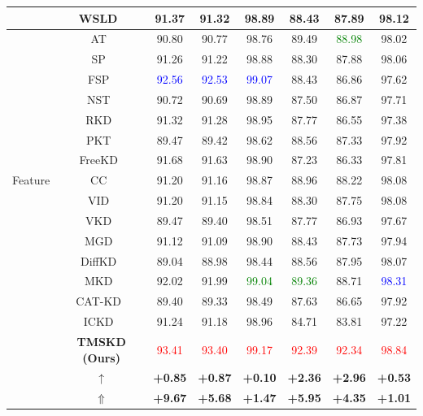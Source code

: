 ﻿\documentclass[lettersize,journal]{IEEEtran}
\begin{document}
\begin{table}[!htbp]
\begin{tabular}{c|c|c|c|c|c|c|c}
& WSLD~\cite{Zhou2021WSLD} & 91.37 & 91.32 & 98.89 & 88.43 & 87.89 & 98.12 \\
\midrule
\multirow{15}{*}{Feature}
& AT~\cite{Zagoruyko2017AT} & 90.80 & 90.77 & 98.76 & 89.49 & \textcolor{green}{88.98} & 98.02 \\
& SP~\cite{Tung2019SP} & 91.26 & 91.22 & 98.88 & 88.30 & 87.88 & 98.06 \\
& FSP~\cite{Yim2017FSP} & \textcolor{blue}{92.56} & \textcolor{blue}{92.53} & \textcolor{blue}{99.07} & 88.43 & 86.86 & 97.62 \\
& NST~\cite{Huang2017NST} & 90.72 & 90.69 & 98.89 & 87.50 & 86.87 & 97.71 \\
& RKD~\cite{Park2019RKD} & 91.32 & 91.28 & 98.95 & 87.77 & 86.55 & 97.38 \\
& PKT~\cite{Passalis2018PKT} & 89.47 & 89.42 & 98.62 & 88.56 & 87.33 & 97.92 \\
& FreeKD~\cite{Zhang2024FreeKD} & 91.68 & 91.63 & 98.90 & 87.23 & 86.33 & 97.81 \\
& CC~\cite{Peng2019CC} & 91.20 & 91.16 & 98.87 & 88.96 & 88.22 & 98.08 \\
& VID~\cite{Ahn2019VID} & 91.20 & 91.15 & 98.84 & 88.30 & 87.75 & 98.08 \\
& VKD~\cite{Miles2024VKD} & 89.47 & 89.40 & 98.51 & 87.77 & 86.93 & 97.67 \\
& MGD~\cite{Yang2022MGD} & 91.12 & 91.09 & 98.90 & 88.43 & 87.73 & 97.94 \\
& DiffKD~\cite{Huang2023DiffKD} & 89.04 & 88.98 & 98.44 & 88.56 & 87.95 & 98.07 \\
& MKD~\cite{Lao2023MKD} & 92.02 & 91.99 & \textcolor{green}{99.04} & \textcolor{green}{89.36} & 88.71 & \textcolor{blue}{98.31} \\
& CAT-KD~\cite{Guo2023CATKD} & 89.40 & 89.33 & 98.49 & 87.63 & 86.65 & 97.92 \\
& ICKD~\cite{Liu2021ICKD} & 91.24 & 91.18 & 98.96 & 84.71 & 83.81 & 97.22 \\
\midrule
\rowcolor{gray!15}
& \textbf{TMSKD (Ours)} &
\textcolor{red}{93.41} &
\textcolor{red}{93.40} &
\textcolor{red}{99.17} &
\textcolor{red}{92.39} &
\textcolor{red}{92.34} &
\textcolor{red}{98.84} \\
& $\uparrow$ & \textbf{+0.85} & \textbf{+0.87} & \textbf{+0.10} & \textbf{+2.36} & \textbf{+2.96} & \textbf{+0.53} \\
& $\Uparrow$ & \textbf{+9.67} & \textbf{+5.68} & \textbf{+1.47} & \textbf{+5.95} & \textbf{+4.35} & \textbf{+1.01} \\
\bottomrule
\end{tabular}
\end{table}
\end{document}
